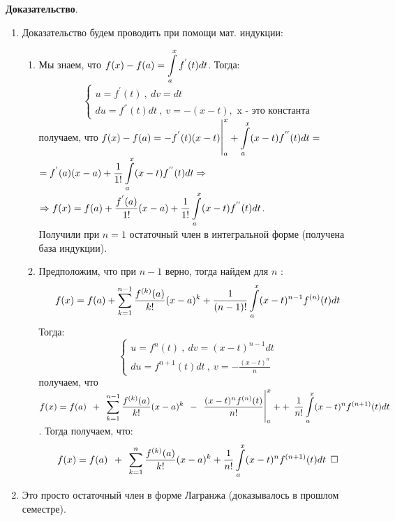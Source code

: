 \documentclass[a4paper,12pt]{article} %
\begin{document}
\textbf{Доказательство}. 
\begin{enumerate}
	\item Доказательство будем проводить при помощи мат. индукции:
	\begin{enumerate}
		\item Мы знаем, что $\Large \displaystyle f(x) - f(a) = \int\limits_{a}^{x} f^{'}(t)dt$. Тогда:
		\begin{equation*}
		\begin{cases}
  		u = f^{'}(t)\ ,\ dv = dt\\
  		du = f^{''}(t)dt\ ,\ v = -(x-t), \text{ x - это константа}
 		\end{cases}
		\end{equation*}
		получаем, что $\Large \displaystyle f(x) - f(a) = -f^{'}(t)(x-t) \bigg|_a^x + \int\limits_a^x (x-t) f^{''}(t)dt = $\\
		$\Large \displaystyle = f^{'}(a)(x-a) + \frac{1}{1!} \int\limits_a^x (x-t) f^{''}(t)dt \Rightarrow$\\
		 $\Rightarrow \Large \displaystyle  f(x) = f(a) + \frac{f^{'}(a)}{1!}(x-a) + \frac{1}{1!} \int\limits_a^x (x-t) f^{''}(t)dt$.\\
	Получили при $n = 1$ остаточный член в интегральной форме (получена база индукции).
		\item Предположим, что при $n - 1$ верно, тогда найдем для $n$ :
		\begin{equation*}
			\Large \displaystyle f(x) = f(a) + \sum\limits_{k = 1}^{n - 1} \frac{f^{(k)}(a)}{k!}(x-a)^k + \frac{1}{(n-1)!}\int\limits_a^x (x-t)^{n - 1} f^{(n)}(t)dt
		\end{equation*}
		Тогда:
		\begin{equation*}
		\begin{cases}
  		u = f^{n}(t)\ ,\ dv = (x-t)^{n-1}dt\\
  		du = f^{n + 1}(t)dt\ ,\ v = -\frac{(x-t)^n}{n}
 		\end{cases}
		\end{equation*}
		получаем, что $\Large \displaystyle f(x) = f(a)\ +\ \sum\limits_{k = 1}^{n - 1} \frac{f^{(k)}(a)}{k!}(x-a)^k\ -\ \frac{(x-t)^n f^{(n)}(t)}{n!} \bigg|_a^x + +\ \frac{1}{n!} \int\limits_a^x (x-t)^n f^{(n+1)}(t)dt$. Тогда получаем, что:
	\begin{equation*}
		\Large \displaystyle f(x) = f(a)\ +\ \sum\limits_{k = 1}^{n} \frac{f^{(k)}(a)}{k!}(x-a)^k + \frac{1}{n!} \int\limits_a^x (x-t)^n f^{(n+1)}(t)dt \ \square
	\end{equation*}
		 
	\end{enumerate}

	\item Это просто остаточный член в форме Лагранжа (доказывалось в прошлом семестре).
\end{enumerate}
\end{document}

